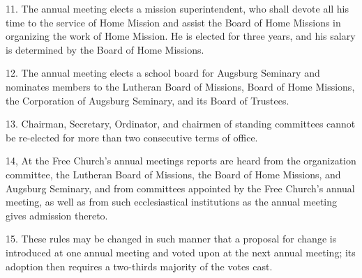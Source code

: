 11. The annual meeting elects a mission superintendent, who shall devote all his time to the service of Home Mission and assist the Board of Home Missions in organizing the work of Home Mission. He is elected for three years, and his salary is determined by the Board of Home Missions.

12. The annual meeting elects a school board for Augsburg Seminary and nominates members to the Lutheran Board of Missions, Board of Home Missions, the Corporation of Augsburg Seminary, and its Board of Trustees.

13. Chairman, Secretary, Ordinator, and chairmen of standing committees cannot be re-elected for more than two consecutive terms of office.

14, At the Free Church’s annual meetings reports are heard from the organization committee, the Lutheran Board of Missions, the Board of Home Missions, and Augsburg Seminary, and from committees appointed by the Free Church’s annual meeting, as well as from such ecclesiastical institutions as the annual meeting gives admission thereto.

15. These rules may be changed in such manner that a proposal for change is introduced at one annual meeting and voted upon at the next annual meeting; its adoption then requires a two-thirds majority of the votes cast.


